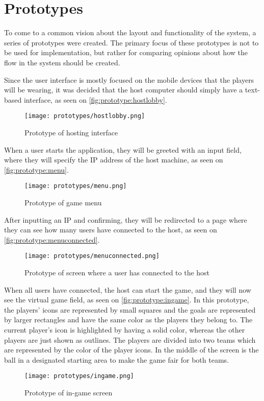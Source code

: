 \section{Prototypes}
To come to a common vision about the layout and functionality of the system, a series of prototypes were created.
The primary focus of these prototypes is not to be used for implementation, but rather for comparing opinions about how the flow in the system should be created.

Since the user interface is mostly focused on the mobile devices that the players will be wearing, it was decided that the host computer should simply have a text-based interface, as seen on \autoref{fig:prototype:hostlobby}.

\begin{figure}[H]
    \centering
    \texttt{[image: prototypes/hostlobby.png]}
    \caption{Prototype of hosting interface}
    \label{fig:prototype:hostlobby}
\end{figure}

When a user starts the application, they will be greeted with an input field, where they will specify the IP address of the host machine, as seen on \autoref{fig:prototype:menu}. 

\begin{figure}[H]
    \centering
    \texttt{[image: prototypes/menu.png]}
    \caption{Prototype of game menu}
    \label{fig:prototype:menu}
\end{figure}

After inputting an IP and confirming, they will be redirected to a page where they can see how many users have connected to the host, as seen on \autoref{fig:prototype:menuconnected}. 

\begin{figure}[H]
    \centering
    \texttt{[image: prototypes/menuconnected.png]}
    \caption{Prototype of screen where a user has connected to the host}
    \label{fig:prototype:menuconnected}
\end{figure}

When all users have connected, the host can start the game, and they will now see the virtual game field, as seen on \autoref{fig:prototype:ingame}.
In this prototype, the players' icons are represented by small squares and the goals are represented by larger rectangles and have the same color as the players they belong to.
The current player's icon is highlighted by having a solid color, whereas the other players are just shown as outlines. 
The players are divided into two teams which are represented by the color of the player icons.
In the middle of the screen is the ball in a designated starting area to make the game fair for both teams.

\begin{figure}[H]
    \centering
    \texttt{[image: prototypes/ingame.png]}
    \caption{Prototype of in-game screen}
    \label{fig:prototype:ingame}
\end{figure}
